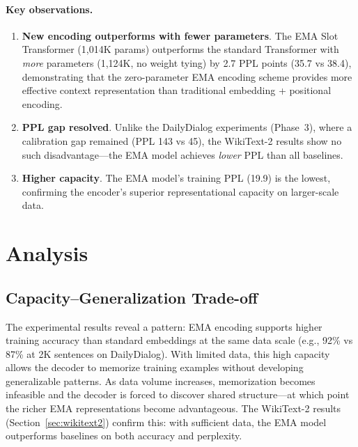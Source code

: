 \documentclass[11pt]{article}
\begin{document}
\paragraph{Key observations.}
\begin{enumerate}[leftmargin=1.5em]
    \item \textbf{New encoding outperforms with fewer parameters}. The EMA Slot Transformer (1,014K params) outperforms the standard Transformer with \emph{more} parameters (1,124K, no weight tying) by 2.7 PPL points (35.7 vs 38.4), demonstrating that the zero-parameter EMA encoding scheme provides more effective context representation than traditional embedding + positional encoding.
    \item \textbf{PPL gap resolved}. Unlike the DailyDialog experiments (Phase~3), where a calibration gap remained (PPL 143 vs 45), the WikiText-2 results show no such disadvantage---the EMA model achieves \emph{lower} PPL than all baselines.
    \item \textbf{Higher capacity}. The EMA model's training PPL (19.9) is the lowest, confirming the encoder's superior representational capacity on larger-scale data.
\end{enumerate}

\section{Analysis}
\label{sec:analysis}

\subsection{Capacity--Generalization Trade-off}

The experimental results reveal a pattern: EMA encoding supports higher training accuracy than standard embeddings at the same data scale (e.g., 92\% vs 87\% at 2K sentences on DailyDialog). With limited data, this high capacity allows the decoder to memorize training examples without developing generalizable patterns. As data volume increases, memorization becomes infeasible and the decoder is forced to discover shared structure---at which point the richer EMA representations become advantageous. The WikiText-2 results (Section~\ref{sec:wikitext2}) confirm this: with sufficient data, the EMA model outperforms baselines on both accuracy and perplexity.
\end{document}

